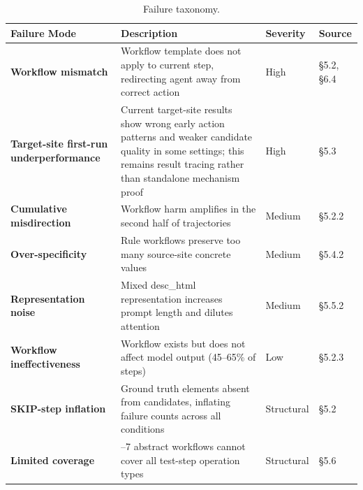 \documentclass{article}
\begin{document}
{\begin{longtable}[]{@{}
  >{\raggedright\arraybackslash}p{}
  >{\raggedright\arraybackslash}p{}
  >{\raggedright\arraybackslash}p{}
  >{\raggedright\arraybackslash}p{}@{}}
\caption{Failure taxonomy.}\\

\toprule\noalign{}
\begin{minipage}[b]{\linewidth}\raggedright
Failure Mode
\end{minipage} & \begin{minipage}[b]{\linewidth}\raggedright
Description
\end{minipage} & \begin{minipage}[b]{\linewidth}\raggedright
Severity
\end{minipage} & \begin{minipage}[b]{\linewidth}\raggedright
Source
\end{minipage} \\
\midrule\noalign{}
\endhead
\bottomrule\noalign{}
\endlastfoot
\textbf{Workflow mismatch} & Workflow template does not apply to current
step, redirecting agent away from correct action & High & §5.2, §6.4 \\
\textbf{Target-site first-run underperformance} & Current target-site
results show wrong early action patterns and weaker candidate quality in
some settings; this remains result tracing rather than standalone
mechanism proof & High & §5.3 \\
\textbf{Cumulative misdirection} & Workflow harm amplifies in the second
half of trajectories & Medium & §5.2.2 \\
\textbf{Over-specificity} & Rule workflows preserve too many source-site
concrete values & Medium & §5.4.2 \\
\textbf{Representation noise} & Mixed desc\_html representation
increases prompt length and dilutes attention & Medium & §5.5.2 \\
\textbf{Workflow ineffectiveness} & Workflow exists but does not affect
model output (45--65\% of steps) & Low & §5.2.3 \\
\textbf{SKIP-step inflation} & Ground truth elements absent from
candidates, inflating failure counts across all conditions & Structural
& §5.2 \\
\textbf{Limited coverage} & 5--7 abstract workflows cannot cover all
test-step operation types & Structural & §5.6 \\
\end{longtable}
\label{tab:failure-taxonomy-main}
}
\end{document}
